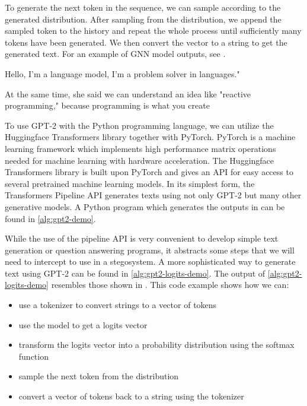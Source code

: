 To generate the next token in the sequence, we can sample according to the generated distribution.
After sampling from the distribution, we append the sampled token to the history and repeat the whole process until sufficiently many tokens have been generated.
We then convert the vector to a string to get the generated text.
For an example of GNN model outputs, see .

\begin{example}
	Hello, I'm a language model, I'm a problem solver in languages."

	At the same time, she said we can understand an idea like "reactive programming," because programming is what you create
	\label{example:gpt2-output-sample}
\end{example}

To use GPT-2 with the Python programming language, we can utilize the Huggingface Transformers library together with PyTorch.
PyTorch is a machine learning framework which implements high performance matrix operations needed for machine learning with hardware acceleration.
The Huggingface Transformers library is built upon PyTorch and gives an API for easy access to several pretrained machine learning models.
In its simplest form, the Transformers Pipeline API generates texts using not only GPT-2 but many other generative models.
A Python program which generates the outputs in  can be found in \autoref{alg:gpt2-demo}.


While the use of the pipeline API is very convenient to develop simple text generation or question answering programs, it abstracts some steps that we will need to intercept to use in a stegosystem.
A more sophisticated way to generate text using GPT-2 can be found in \autoref{alg:gpt2-logits-demo}.
The output of \autoref{alg:gpt2-logits-demo} resembles those shown in . 
This code example shows how we can:

\begin{itemize}
	\item use a tokenizer to convert strings to a vector of tokens
	\item use the model to get a logits vector
	\item transform the logits vector into a probability distribution using the softmax function
	\item sample the next token from the distribution
	\item convert a vector of tokens back to a string using the tokenizer
\end{itemize}


